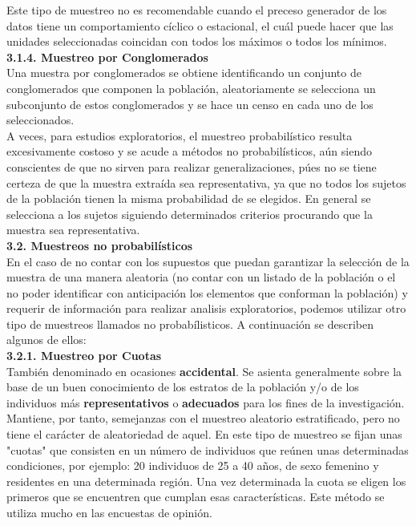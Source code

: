 \documentclass[base=hide,11pt]{elegantbook}
\begin{document}
{Este tipo de muestreo no es recomendable cuando el preceso generador de los datos tiene un comportamiento cíclico o estacional, el cuál puede hacer que las unidades seleccionadas coincidan con todos los máximos o todos los mínimos. \\
			
\textcolor{col4}{\bf \large 3.1.4. Muestreo por Conglomerados}\\ 
Una muestra por conglomerados se obtiene identificando un conjunto de conglomerados que componen la población, aleatoriamente se selecciona un subconjunto de estos conglomerados y se hace un censo en cada uno de los seleccionados.\\
			
A veces, para estudios exploratorios, el muestreo probabilístico resulta excesivamente costoso y se acude a métodos no probabilísticos, aún siendo conscientes de que no sirven para realizar generalizaciones, púes no se tiene certeza de que la muestra extraída sea representativa, ya que no todos los sujetos de la población tienen la misma probabilidad de se elegidos. En general se selecciona a los sujetos siguiendo determinados criterios procurando que la muestra sea representativa.\\
			
\textcolor{col4}{\bf \LARGE 3.2. Muestreos no probabilísticos}\\
En el caso de no contar con los supuestos que puedan garantizar la selección de la muestra de una manera aleatoria (no contar con un listado de la población o el no poder identificar con anticipación los elementos que conforman la población) y requerir de información para realizar analisis exploratorios, podemos utilizar otro tipo de muestreos llamados no probabílisticos. A continuación se describen algunos de ellos:\\
			
\textcolor{col4}{\bf \large 3.2.1. Muestreo por Cuotas}\\ 
También denominado en ocasiones {\bf  accidental}. Se asienta generalmente sobre la base de un buen conocimiento de los estratos de la población y/o de los individuos más {\bf representativos} o {\bf adecuados} para los fines de la investigación. Mantiene, por tanto, semejanzas con el muestreo aleatorio estratificado, pero no tiene el carácter de aleatoriedad de aquel. En este tipo de muestreo se fijan unas "cuotas" que consisten en un número de individuos que reúnen unas determinadas condiciones, por ejemplo: 20 individuos de 25 a 40 años, de sexo femenino y residentes en una determinada región. Una vez determinada la cuota se eligen los primeros que se encuentren que cumplan esas características. Este método se utiliza mucho en las encuestas de opinión.\\
			
}
\end{document}
